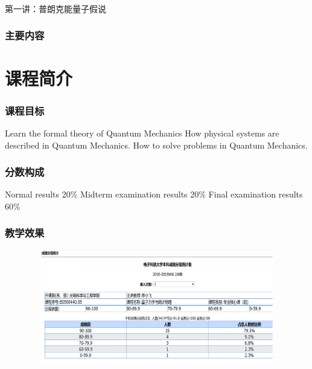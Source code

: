 \begin{frame} [plain]
    \frametitle{}
    \Background[1] 
    \begin{center}
    { {\huge 第一讲：普朗克能量子假说 }}
    \end{center}  
    \addtocounter{framenumber}{-1}   
\end{frame}

\begin{frame}
        \frametitle{主要内容}
        \transfade
        \tableofcontents
        \addtocounter{framenumber}{-1} 
\end{frame}

\section{课程简介}

\begin{frame}[t]
    \frametitle{课程目标}
        \begin{enumerate}
            \Item Learn the formal theory of Quantum Mechanics
            \IItem How physical systems are described in Quantum Mechanics.
            \Item How to solve problems in Quantum Mechanics.
        \end{enumerate}
\end{frame}
\begin{frame} [t]
    \frametitle{分数构成}
        \begin{enumerate}
            \Item Normal results 20\%
            \Item Midterm examination results 20\%
            \Item Final examination results 60\%
        \end{enumerate}
\end{frame}

\begin{frame} [t]
    \frametitle{教学效果}
    \centering
    \includegraphics[width=1.0\textwidth,height=5.0cm]{figs/exam1.png}
\end{frame}

